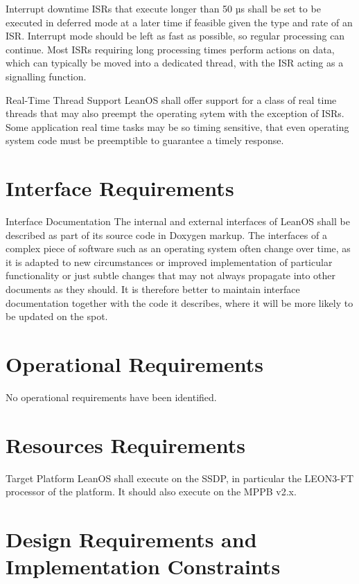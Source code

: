  {Interrupt downtime}{%
\glspl{ISR} that execute longer than 50 µs shall be set to be executed in
deferred mode at a later time if feasible given the type and rate of an \gls{ISR}.
}{
Interrupt mode should be left as fast as possible, so regular processing can
continue. Most \glspl{ISR} requiring long processing times perform actions on
data, which can typically be moved into a dedicated thread, with the \gls{ISR}
acting as a signalling function.
}%

 {Real-Time Thread Support}{%
LeanOS shall offer support for a class of real time threads that may also
preempt the operating sytem with the exception of \glspl{ISR}.
}{%
Some application real time tasks may be so timing sensitive, that even
operating system code must be preemptible to guarantee a timely response.
}%

\section{Interface Requirements}

 {Interface Documentation}{%
The internal and external interfaces of LeanOS shall be described as part
of its source code in Doxygen markup.
}{
The interfaces of a complex piece of software such as an operating system
often change over time, as it is adapted to new circumstances or improved
implementation of particular functionality or just subtle changes that may not
always propagate into other documents as they should. It is therefore better to
maintain interface documentation together with the code it describes, where it
will be more likely to be updated on the spot.
}%


\section{Operational Requirements}

No operational requirements have been identified.


\section{Resources Requirements}

 {Target Platform}{%
LeanOS shall execute on the \gls{SSDP}, in particular the \gls{LEON3-FT}
processor of the platform. It should also execute on the \gls{MPPB} v2.x.
}{}%


\section{Design Requirements and Implementation Constraints}


